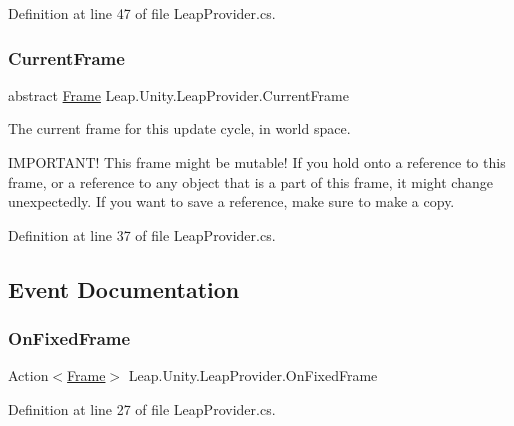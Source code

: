 Definition at line 47 of file Leap\+Provider.\+cs.

\mbox{\label{class_leap_1_1_unity_1_1_leap_provider_a9a5cf65099912311c37f340d3be7e454}} 
\subsubsection{\texorpdfstring{CurrentFrame}{CurrentFrame}}
{\footnotesize\ttfamily abstract \mbox{\hyperlink{class_leap_1_1_frame}{Frame}} Leap.\+Unity.\+Leap\+Provider.\+Current\+Frame\hspace{0.3cm}{\ttfamily [get]}}



The current frame for this update cycle, in world space. 

I\+M\+P\+O\+R\+T\+A\+N\+T! This frame might be mutable! If you hold onto a reference to this frame, or a reference to any object that is a part of this frame, it might change unexpectedly. If you want to save a reference, make sure to make a copy. 

Definition at line 37 of file Leap\+Provider.\+cs.



\subsection{Event Documentation}
\mbox{\label{class_leap_1_1_unity_1_1_leap_provider_a125e19c25c0006a12f53e3069627b87f}} 
\subsubsection{\texorpdfstring{OnFixedFrame}{OnFixedFrame}}
{\footnotesize\ttfamily Action$<$\mbox{\hyperlink{class_leap_1_1_frame}{Frame}}$>$ Leap.\+Unity.\+Leap\+Provider.\+On\+Fixed\+Frame}



Definition at line 27 of file Leap\+Provider.\+cs.

\mbox{\label{class_leap_1_1_unity_1_1_leap_provider_a4f7285be55b0ff2d23cbb0b4e3fb856a}} 
